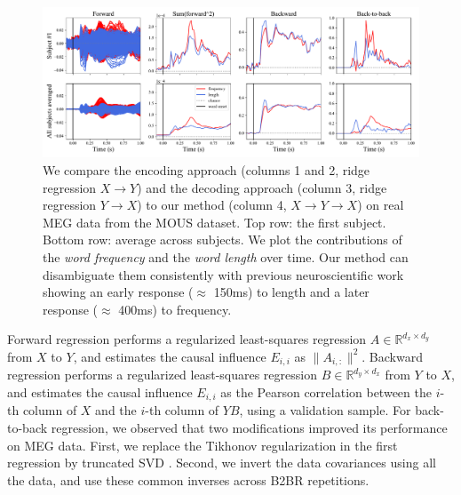 \begin{figure}[t!]
  \centering
  \includegraphics[width=\textwidth, trim=0cm 0cm 0cm 0cm, clip=True]{figures/meg_twocurves.pdf}
  \caption{We compare the encoding approach (columns 1 and 2, ridge regression $X \rightarrow Y$) and the decoding approach (column 3, ridge regression $Y \rightarrow X$) to our method (column 4, $X \rightarrow Y \rightarrow X$) on real MEG data from the MOUS dataset. Top row: the first subject. Bottom row: average across subjects.
  We plot the contributions of the \textit{word frequency} and the \textit{word
  length} over time. Our method can disambiguate them consistently with
  previous neuroscientific work showing an early response ($\approx$ 150ms) to
  length and a later response ($\approx$ 400ms) to frequency.}
  \label{fig:meg_twocurves}
\end{figure}

Forward regression performs a regularized least-squares regression $A \in \mathbb{R}^{d_x \times d_y}$ from $X$ to $Y$, and estimates the causal influence $E_{i,i}$ as $\| A_{i, :} \|^2$.
%
Backward regression performs a regularized least-squares regression $B \in \mathbb{R}^{d_y \times d_x}$ from $Y$ to $X$, and estimates the causal influence $E_{i, i}$ as the Pearson correlation between the $i$-th column of $X$ and the $i$-th column of $YB$, using a validation sample.
%
For back-to-back regression, we observed that two modifications improved its performance on MEG data.
%
First, we replace the Tikhonov regularization in the first regression by truncated SVD \citep{HansenTSVD}.
%
Second, we invert the data covariances using all the data, and use these common inverses across B2BR repetitions.

